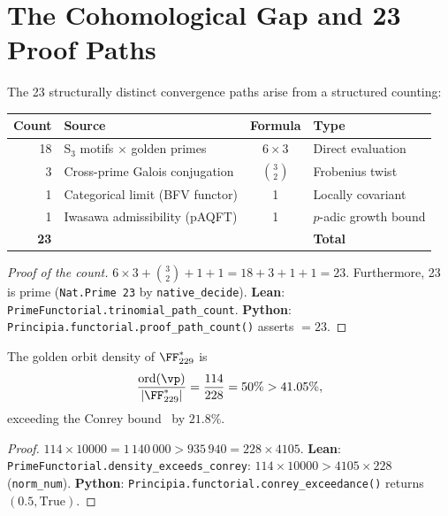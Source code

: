 \section{The Cohomological Gap and 23 Proof Paths}
\label{sec:23-paths}

The 23 structurally distinct convergence paths arise from a structured counting:

\begin{center}
\begin{tabular}{rlcl}
\toprule
Count & Source & Formula & Type \\
\midrule
18 & S$_3$ motifs $\times$ golden primes & $6 \times 3$ & Direct evaluation \\
3  & Cross-prime Galois conjugation & $\binom{3}{2}$ & Frobenius twist \\
1  & Categorical limit (BFV functor) & 1 & Locally covariant \\
1  & Iwasawa admissibility (pAQFT) & 1 & $p$-adic growth bound \\
\midrule
\textbf{23} & & & \textbf{Total} \\
\bottomrule
\end{tabular}
\end{center}

\begin{proof}[Proof of the count]
$6 \times 3 + \binom{3}{2} + 1 + 1 = 18 + 3 + 1 + 1 = 23$.  Furthermore, 23 is prime (\texttt{Nat.Prime 23} by \texttt{native\_decide}).
\textbf{Lean}: \texttt{PrimeFunctorial.trinomial\_path\_count}.
\textbf{Python}: \texttt{Principia.functorial.proof\_path\_count()} asserts $= 23$.
\end{proof}

\begin{theorem}
The golden orbit density of $\FF_{229}^*$ is
\[
\frac{\mathrm{ord}(\vp)}{|\FF_{229}^*|} = \frac{114}{228} = 50\% > 41.05\%,
\]
exceeding the Conrey bound~\cite{Conrey89} by $21.8\%$.
\end{theorem}

\begin{proof}
$114 \times 10000 = 1\,140\,000 > 935\,940 = 228 \times 4105$.
\textbf{Lean}: \texttt{PrimeFunctorial.density\_exceeds\_conrey}: $114 \times 10000 > 4105 \times 228$ (\texttt{norm\_num}).
\textbf{Python}: \texttt{Principia.functorial.conrey\_exceedance()} returns $(0.5, \mathrm{True})$.
\end{proof}

